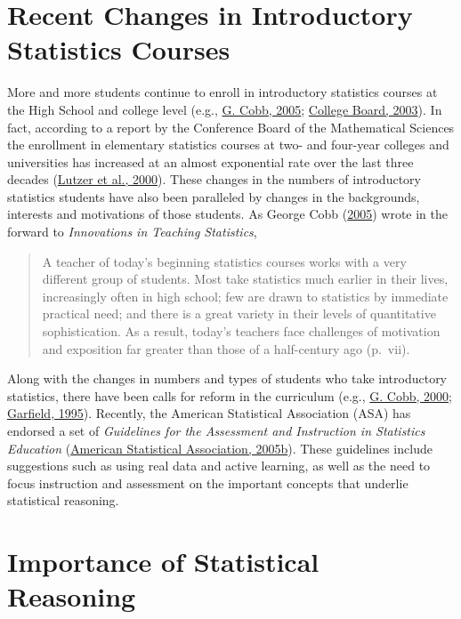 \documentclass[11pt]{umnthesis}
\begin{document}
\hypertarget{recent-changes-in-introductory-statistics-courses}{%
\section{Recent Changes in Introductory Statistics Courses}\label{recent-changes-in-introductory-statistics-courses}}

More and more students continue to enroll in introductory statistics courses at the High School and college level (e.g., \protect\hyperlink{ref-cobb:2005}{G. Cobb, 2005}; \protect\hyperlink{ref-college-board:2003}{College Board, 2003}). In fact, according to a report by the Conference Board of the Mathematical Sciences the enrollment in elementary statistics courses at two- and four-year colleges and universities has increased at an almost exponential rate over the last three decades (\protect\hyperlink{ref-lutzer:2000}{Lutzer et al., 2000}). These changes in the numbers of introductory statistics students have also been paralleled by changes in the backgrounds, interests and motivations of those students. As George Cobb (\protect\hyperlink{ref-cobb:2005}{2005}) wrote in the forward to \emph{Innovations in Teaching Statistics},

\begin{quote}
A teacher of today's beginning statistics courses works with a very different group of students. Most take statistics much earlier in their lives, increasingly often in high school; few are drawn to statistics by immediate practical need; and there is a great variety in their levels of quantitative sophistication. As a result, today's teachers face challenges of motivation and exposition far greater than those of a half-century ago (p.~vii).
\end{quote}

Along with the changes in numbers and types of students who take introductory statistics, there have been calls for reform in the curriculum (e.g., \protect\hyperlink{ref-cobb:2000}{G. Cobb, 2000}; \protect\hyperlink{ref-garfield:1995}{Garfield, 1995}). Recently, the American Statistical Association (ASA) has endorsed a set of \emph{Guidelines for the Assessment and Instruction in Statistics Education} (\protect\hyperlink{ref-asa:2005a}{American Statistical Association, 2005b}). These guidelines include suggestions such as using real data and active learning, as well as the need to focus instruction and assessment on the important concepts that underlie statistical reasoning.

\hypertarget{importance-of-statistical-reasoning}{%
\section{Importance of Statistical Reasoning}\label{importance-of-statistical-reasoning}}
\end{document}

